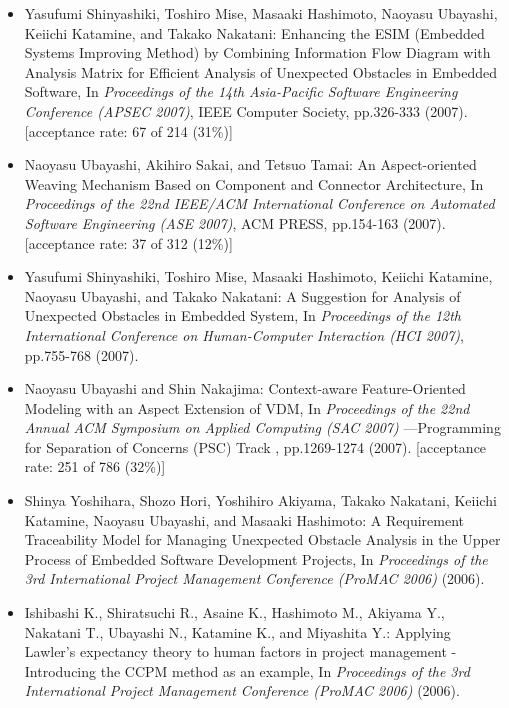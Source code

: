 \documentclass{jarticle}
\begin{document}
\begin{itemize}
\item Yasufumi Shinyashiki, Toshiro Mise, Masaaki Hashimoto, Naoyasu Ubayashi, Keiichi Katamine, and Takako Nakatani:
Enhancing the ESIM (Embedded Systems Improving Method) by Combining Information Flow Diagram with Analysis Matrix for Efficient Analysis of Unexpected Obstacles in Embedded Software,
In {\em Proceedings of the 14th Asia-Pacific Software Engineering Conference (APSEC 2007)},
IEEE Computer Society,
pp.326-333 (2007).
[acceptance rate: 67 of 214 (31\%)]

\item Naoyasu Ubayashi, Akihiro Sakai, and Tetsuo Tamai:
An Aspect-oriented Weaving Mechanism Based on Component and Connector Architecture,
In {\em Proceedings of the 22nd IEEE/ACM International Conference on Automated Software Engineering (ASE 2007)},
ACM PRESS,
pp.154-163 (2007).
[acceptance rate: 37 of 312 (12\%)]

\item Yasufumi Shinyashiki, Toshiro Mise, Masaaki Hashimoto, Keiichi Katamine, Naoyasu Ubayashi, and Takako Nakatani:
A Suggestion for Analysis of Unexpected Obstacles in Embedded System,
In {\em Proceedings of the 12th International Conference on Human-Computer Interaction (HCI 2007)},
pp.755-768 (2007).

\item Naoyasu Ubayashi and Shin Nakajima:
Context-aware Feature-Oriented Modeling with an Aspect Extension of VDM,
In {\em Proceedings of the 22nd Annual ACM Symposium on Applied Computing (SAC 2007)} ---Programming for Separation of Concerns (PSC) Track ,
pp.1269-1274 (2007).
[acceptance rate: 251 of 786 (32\%)]

\item Shinya Yoshihara, Shozo Hori, Yoshihiro Akiyama, Takako Nakatani, Keiichi Katamine, Naoyasu Ubayashi, and Masaaki Hashimoto:
A Requirement Traceability Model for Managing Unexpected Obstacle Analysis in the Upper Process of Embedded Software Development Projects,
In {\em Proceedings of the 3rd International Project Management Conference (ProMAC 2006)} (2006).

\item Ishibashi K., Shiratsuchi R., Asaine K., Hashimoto M., Akiyama Y., Nakatani T., Ubayashi N., Katamine K., and Miyashita Y.:
Applying Lawler's expectancy theory to human factors in project management -Introducing the CCPM method as an example,
In {\em Proceedings of the 3rd International Project Management Conference (ProMAC 2006)} (2006).


\end{itemize}
\end{document}
